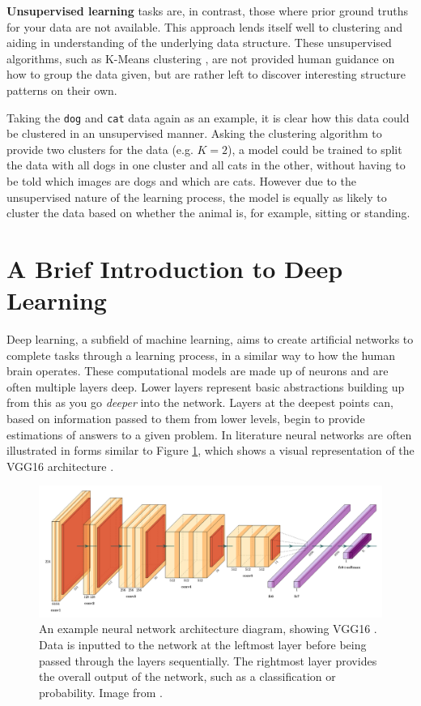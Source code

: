 \textbf{Unsupervised learning} tasks are, in contrast, those where prior ground truths for your data are not available. This approach lends itself well to clustering and aiding in understanding of the underlying data structure. These unsupervised algorithms, such as K-Means clustering \cite{hartigan_algorithm_1979}, are not provided human guidance on how to group the data given, but are rather left to discover interesting structure patterns on their own. 

Taking the \texttt{dog} and \texttt{cat} data again as an example, it is clear how this data could be clustered in an unsupervised manner. Asking the clustering algorithm to provide two clusters for the data  (e.g. $K = 2$), a model could be trained to split the data with all dogs in one cluster and all cats in the other, without having to be told which images are dogs and which are cats. However due to the unsupervised nature of the learning process, the model is equally as likely to cluster the data based on whether the animal is, for example, sitting or standing. 

\section{A Brief Introduction to Deep Learning}\label{ch:Background,sec:DLIntro}

Deep learning, a subfield of machine learning, aims to create artificial networks to complete tasks through a learning process, in a similar way to how the human brain operates. These computational models are made up of neurons and are often multiple layers deep. Lower layers represent basic abstractions building up from this as you go \textit{deeper} into the network. Layers at the deepest points can, based on information passed to them from lower levels, begin to provide estimations of answers to a given problem. In literature neural networks are often illustrated in forms similar to Figure \ref{fig:NN-example}, which shows a visual representation of the VGG16 architecture \cite{simonyan_very_2015}. 

\begin{figure}
	\begin{center}
		\includegraphics[scale=0.2]{Chapter2/figs/example-model.png}
	\end{center}
	\caption{An example neural network architecture diagram, showing VGG16 \cite{simonyan_very_2015}. Data is inputted to the network at the leftmost layer before being passed through the layers sequentially. The rightmost layer provides the overall output of the network, such as a classification or probability. Image from \cite{harislqbal88_plotneuralnet_2018}.}
	\label{fig:NN-example}
\end{figure}

